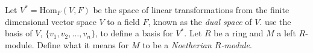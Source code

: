 \documentclass{exam}
\newcommand{\homgroup}[3]{\text{Hom}_{#1}(#2, #3)}
\begin{document}
\begin{center}
\end{center}
\vspace*{1em}
\begin{questions}
    \question[3]
        Let $V^* =\homgroup{F}{V}{F}$ be the space of linear transformations from the finite dimensional vector space $V$ to a field $F$, known 
        as the \textit{dual space} of $V$. use the basis of $V$, $\{v_1, v_2, \dots, v_n\}$, to define a basis for $V^*$.
    \question[2]
        Let $R$ be a ring and $M$ a left $R$-module. Define what it means for $M$ to be a \textit{Noetherian $R$-module}.
\end{questions}
\end{document}
